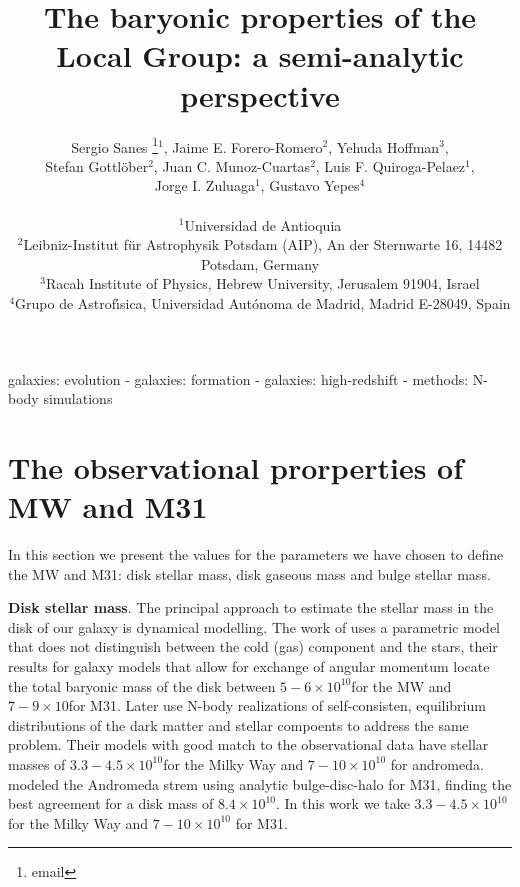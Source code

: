 \documentclass[usenatbib]{mn2e}
\newcommand{\Msun}{{\ifmmode{{\rm {M_{\odot}}}}\else{${\rm{M_{\odot}}}$}\fi}}
\begin{document}
\title[The baryonic LG in SAMs]{The baryonic properties of the Local Group: a semi-analytic perspective}
\author[Sanes et al.]{
\parbox[t]{\textwidth}{\raggedright 
  Sergio Sanes \thanks{email}$^1$, 
  Jaime E. Forero-Romero$^2$,
  Yehuda Hoffman$^3$,\\
  Stefan Gottl\"ober$^2$,
  Juan C. Munoz-Cuartas$^2$,
  Luis F. Quiroga-Pelaez$^1$,\\
  Jorge I. Zuluaga$^1$,
  Gustavo Yepes$^4$}
\vspace*{6pt}\\
$^1$Universidad de Antioquia\\
$^2$Leibniz-Institut f\"ur Astrophysik Potsdam (AIP), An der Sternwarte 16, 14482 Potsdam, Germany\\ 
$^3$Racah Institute of Physics, Hebrew University, Jerusalem 91904, 
 Israel\\ 
$^4$Grupo de Astrof\'{\i}sica, Universidad Aut\'onoma de Madrid,   Madrid
E-28049, Spain\\
}
\maketitle

\begin{abstract}

\end{abstract}
\begin{keywords}
galaxies: evolution - galaxies: formation -
galaxies: high-redshift - methods: N-body simulations
\end{keywords}

\section{The observational prorperties of MW and M31}  
\label{sec:discussion}  

In this section we present the values for the parameters we have chosen to define the MW and M31: disk stellar mass, disk gaseous mass and bulge stellar mass.

{\bf Disk stellar mass}. The principal approach to estimate the stellar mass in the disk of our galaxy is dynamical modelling. The work of \cite{Klypin2002} uses a parametric model that does not distinguish between the cold (gas) component and the stars, their results for galaxy models that allow for exchange of angular momentum locate the total baryonic mass of the disk between $5-6\times 10^{10}$\Msun for the MW and $7-9\times 10$\Msun for M31. Later \cite{Widrow2005} use N-body realizations of self-consisten, equilibrium distributions of the dark matter and stellar compoents to address the same problem. Their models with good match to the observational data have stellar masses of $3.3-4.5\times 10^{10}$\Msun for the Milky Way and $7-10\times 10^{10}$ for andromeda. \citep{Geehan2006} modeled the Andromeda strem using analytic bulge-disc-halo for M31, finding the best agreement for a disk mass of $8.4\times 10^{10}$\Msun. In this work we take $3.3-4.5\times 10^{10}$\Msun for the Milky Way and $7-10\times 10^{10}$ for M31.  
\end{document}

